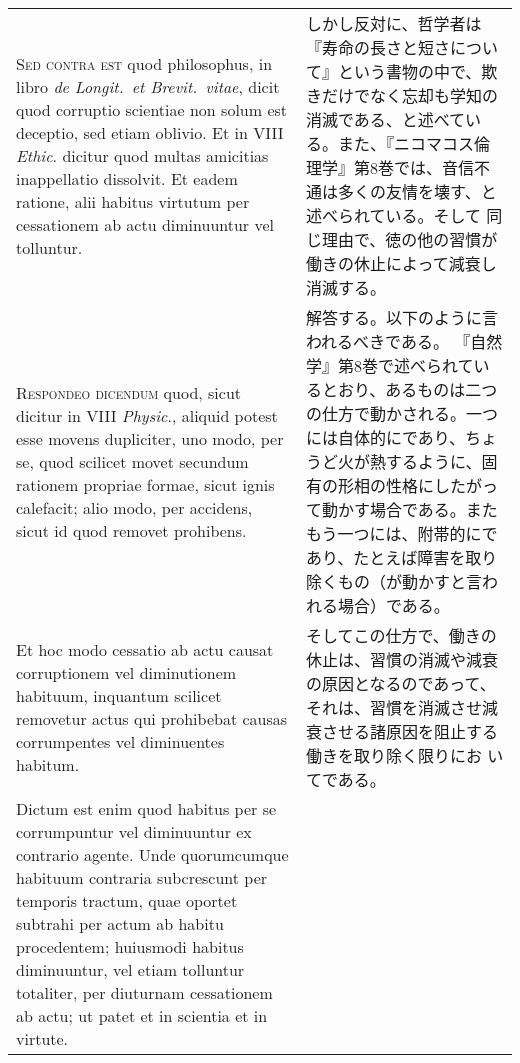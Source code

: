 \documentclass[10pt]{jsarticle} %
\begin{document}
\begin{longtable}{p{21em}p{21em}}
\\



{\scshape Sed contra est} quod philosophus, in libro {\itshape de Longit.~et Brevit.~vitae},
dicit quod corruptio scientiae non solum est deceptio, sed etiam
oblivio. Et in VIII {\itshape Ethic}. dicitur quod multas amicitias inappellatio
dissolvit. Et eadem ratione, alii habitus virtutum per cessationem ab
actu diminuuntur vel tolluntur.

&

しかし反対に、哲学者は『寿命の長さと短さについて』という書物の中で、欺
きだけでなく忘却も学知の消滅である、と述べている。また、『ニコマコス倫
理学』第8巻では、音信不通は多くの友情を壊す、と述べられている。そして
同じ理由で、徳の他の習慣が働きの休止によって減衰し消滅する。

\\



{\scshape Respondeo dicendum} quod, sicut dicitur in VIII {\itshape Physic}., aliquid potest
esse movens dupliciter, uno modo, per se, quod scilicet movet secundum
rationem propriae formae, sicut ignis calefacit; alio modo, per
accidens, sicut id quod removet prohibens. 


&

解答する。以下のように言われるべきである。
『自然学』第8巻で述べられているとおり、あるものは二つの仕方で動かされる。一つには自体的にであり、ちょうど火が熱するように、固有の形相の性格にしたがって動かす場合である。またもう一つには、附帯的にであり、たとえば障害を取り除くもの（が動かすと言われる場合）である。


\\

Et hoc modo cessatio ab
actu causat corruptionem vel diminutionem habituum, inquantum scilicet
removetur actus qui prohibebat causas corrumpentes vel diminuentes
habitum. 


&


そしてこの仕方で、働きの休止は、習慣の消滅や減衰の原因となるのであって、
それは、習慣を消滅させ減衰させる諸原因を阻止する働きを取り除く限りにお
いてである。

\\


Dictum est enim quod habitus per se corrumpuntur vel
diminuuntur ex contrario agente. Unde quorumcumque habituum contraria
subcrescunt per temporis tractum, quae oportet subtrahi per actum ab
habitu procedentem; huiusmodi habitus diminuuntur, vel etiam tolluntur
totaliter, per diuturnam cessationem ab actu; ut patet et in scientia
et in virtute. 



\end{longtable}
\end{document}
